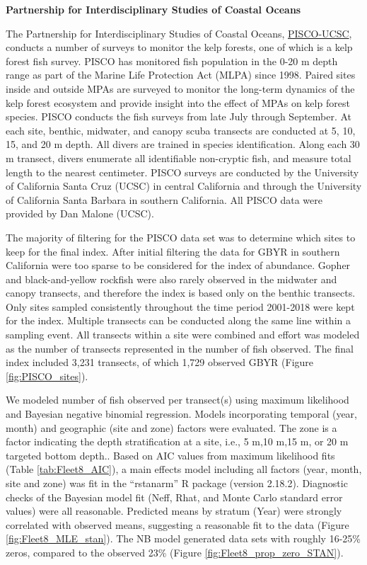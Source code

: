 \documentclass[12pt,]{article}
\begin{document}
\textbf{Partnership for Interdisciplinary Studies of Coastal Oceans}

The Partnership for Interdisciplinary Studies of Coastal Oceans,
\href{http://www.piscoweb.org/kelp-forest-study}{PISCO-UCSC}, conducts a
number of surveys to monitor the kelp forests, one of which is a kelp
forest fish survey. PISCO has monitored fish population in the 0-20 m
depth range as part of the Marine Life Protection Act (MLPA) since 1998.
Paired sites inside and outside MPAs are surveyed to monitor the
long-term dynamics of the kelp forest ecosystem and provide insight into
the effect of MPAs on kelp forest species. PISCO conducts the fish
surveys from late July through September. At each site, benthic,
midwater, and canopy scuba transects are conducted at 5, 10, 15, and 20
m depth. All divers are trained in species identification. Along each 30
m transect, divers enumerate all identifiable non-cryptic fish, and
measure total length to the nearest centimeter. PISCO surveys are
conducted by the University of California Santa Cruz (UCSC) in central
California and through the University of California Santa Barbara in
southern California. All PISCO data were provided by Dan Malone (UCSC).

The majority of filtering for the PISCO data set was to determine which
sites to keep for the final index. After initial filtering the data for
GBYR in southern California were too sparse to be considered for the
index of abundance. Gopher and black-and-yellow rockfish were also
rarely observed in the midwater and canopy transects, and therefore the
index is based only on the benthic transects. Only sites sampled
consistently throughout the time period 2001-2018 were kept for the
index. Multiple transects can be conducted along the same line within a
sampling event. All transects within a site were combined and effort was
modeled as the number of transects represented in the number of fish
observed. The final index included 3,231 transects, of which 1,729
observed GBYR (Figure \ref{fig:PISCO_sites}).

We modeled number of fish observed per transect(s) using maximum
likelihood and Bayesian negative binomial regression. Models
incorporating temporal (year, month) and geographic (site and zone)
factors were evaluated. The zone is a factor indicating the depth
stratification at a site, i.e., 5 m,10 m,15 m, or 20 m targeted bottom
depth.. Based on AIC values from maximum likelihood fits (Table
\ref{tab:Fleet8_AIC}), a main effects model including all factors (year,
month, site and zone) was fit in the ``rstanarm'' R package (version
2.18.2). Diagnostic checks of the Bayesian model fit (Neff, Rhat, and
Monte Carlo standard error values) were all reasonable. Predicted means
by stratum (Year) were strongly correlated with observed means,
suggesting a reasonable fit to the data (Figure
\ref{fig:Fleet8_MLE_stan}). The NB model generated data sets with
roughly 16-25\% zeros, compared to the observed 23\% (Figure
\ref{fig:Fleet8_prop_zero_STAN}).
\end{document}
